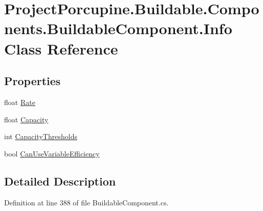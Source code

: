 \hypertarget{class_project_porcupine_1_1_buildable_1_1_components_1_1_buildable_component_1_1_info}{}\section{Project\+Porcupine.\+Buildable.\+Components.\+Buildable\+Component.\+Info Class Reference}
\label{class_project_porcupine_1_1_buildable_1_1_components_1_1_buildable_component_1_1_info}
\subsection*{Properties}
\begin{DoxyCompactItemize}
\item 
float \hyperlink{class_project_porcupine_1_1_buildable_1_1_components_1_1_buildable_component_1_1_info_a27cf5c173072168903172f552b2104c2}{Rate}
\item 
float \hyperlink{class_project_porcupine_1_1_buildable_1_1_components_1_1_buildable_component_1_1_info_af2d243fbabf787e0e98e0ddc6f32d542}{Capacity}
\item 
int \hyperlink{class_project_porcupine_1_1_buildable_1_1_components_1_1_buildable_component_1_1_info_a8eabce9673d0bcfb00f4f0b70673908c}{Capacity\+Thresholds}
\item 
bool \hyperlink{class_project_porcupine_1_1_buildable_1_1_components_1_1_buildable_component_1_1_info_a6be04bb24e6f06fa89e05d0420bc0011}{Can\+Use\+Variable\+Efficiency}
\end{DoxyCompactItemize}


\subsection{Detailed Description}


Definition at line 388 of file Buildable\+Component.\+cs.



